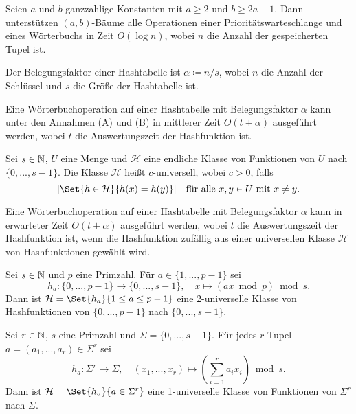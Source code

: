 \documentclass{cheat-sheet}
\begin{document}
\begin{satz}
  Seien $a$ und $b$ ganzzahlige Konstanten mit $a \geq 2$ und $b \geq 2 a - 1$. Dann unterstützen $(a, b)$-Bäume alle Operationen einer Prioritätswarteschlange und eines Wörterbuchs in Zeit $O(\log n)$, wobei $n$ die Anzahl der gespeicherten Tupel ist.
\end{satz}

\begin{defn}
  Der Belegungsfaktor einer Hashtabelle ist $\alpha \coloneqq n / s$, wobei $n$ die Anzahl der Schlüssel und $s$ die Größe der Hashtabelle ist.
\end{defn}

\begin{satz}
  Eine Wörterbuchoperation auf einer Hashtabelle mit Belegungsfaktor $\alpha$ kann unter den Annahmen (A) und (B) in mittlerer Zeit $O(t + \alpha)$ ausgeführt werden, wobei $t$ die Auswertungszeit der Hashfunktion ist.
\end{satz}



\begin{defn}
  Sei $s \in \mathbb{N}$, $U$ eine Menge und $\mathcal{H}$ eine endliche Klasse von Funktionen von $U$ nach $\{ 0, ..., s-1 \}$. Die Klasse $\mathcal{H}$ heißt $c$-universell, wobei $c > 0$, falls
  \[
    \abs{\Set{h \in \mathcal{H}}{ h(x) = h(y) }} \quad \text{für alle $x, y \in U$ mit $x \not= y$.}
  \]
\end{defn}

\begin{satz}
  Eine Wörterbuchoperation auf einer Hashtabelle mit Belegungsfaktor $\alpha$ kann in erwarteter Zeit $O(t + \alpha)$ ausgeführt werden, wobei $t$ die Auswertungszeit der Hashfunktion ist, wenn die Hashfunktion zufällig aus einer universellen Klasse $\mathcal{H}$ von Hashfunktionen gewählt wird.
\end{satz}

\begin{lem}
  Sei $s \in \mathbb{N}$ und $p$ eine Primzahl. Für $a \in \{ 1, ..., p-1 \}$ sei
  \[
    h_a : \{ 0, ..., p{-}1 \} \to \{ 0, ..., s{-}1 \}, \quad
    x \mapsto (ax \bmod p) \bmod s.
  \]
  Dann ist $\mathcal{H} = \Set{h_a}{1 \leq a \leq p-1}$ eine 2-universelle Klasse von Hashfunktionen von $\{ 0, ..., p{-}1 \}$ nach $\{ 0, ..., s{-}1 \}$.
\end{lem}

\begin{lem}
  Sei $r \in \mathbb{N}$, $s$ eine Primzahl und $\Sigma = \{ 0, ..., s{-}1 \}$. Für jedes $r$-Tupel $a = (a_1, ..., a_r) \in \Sigma^r$ sei
  \[
    h_a : \Sigma^r \to \Sigma, \quad
    (x_1, ..., x_r) \mapsto \left( \sum_{i=1}^r a_i x_i \right) \bmod s.
  \]
  Dann ist $\mathcal{H} = \Set{h_a}{a \in \Sigma^r}$ eine 1-universelle Klasse von Funktionen von $\Sigma^r$ nach $\Sigma$.
\end{lem}
\end{document}

